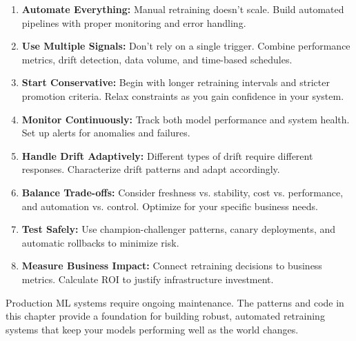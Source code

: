 \begin{enumerate}
    \item \textbf{Automate Everything:} Manual retraining doesn't scale. Build automated pipelines with proper monitoring and error handling.

    \item \textbf{Use Multiple Signals:} Don't rely on a single trigger. Combine performance metrics, drift detection, data volume, and time-based schedules.

    \item \textbf{Start Conservative:} Begin with longer retraining intervals and stricter promotion criteria. Relax constraints as you gain confidence in your system.

    \item \textbf{Monitor Continuously:} Track both model performance and system health. Set up alerts for anomalies and failures.

    \item \textbf{Handle Drift Adaptively:} Different types of drift require different responses. Characterize drift patterns and adapt accordingly.

    \item \textbf{Balance Trade-offs:} Consider freshness vs. stability, cost vs. performance, and automation vs. control. Optimize for your specific business needs.

    \item \textbf{Test Safely:} Use champion-challenger patterns, canary deployments, and automatic rollbacks to minimize risk.

    \item \textbf{Measure Business Impact:} Connect retraining decisions to business metrics. Calculate ROI to justify infrastructure investment.
\end{enumerate}

Production ML systems require ongoing maintenance. The patterns and code in this chapter provide a foundation for building robust, automated retraining systems that keep your models performing well as the world changes.

